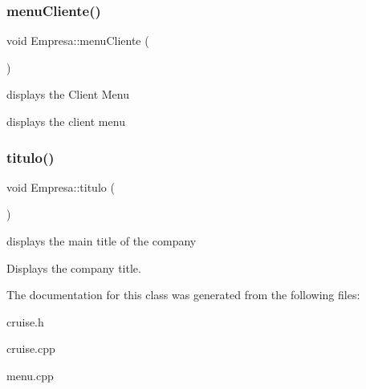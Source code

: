 \subsubsection{\texorpdfstring{menu\+Cliente()}{menuCliente()}}
{\footnotesize\ttfamily void Empresa\+::menu\+Cliente (\begin{DoxyParamCaption}{ }\end{DoxyParamCaption})}



displays the Client Menu 

displays the client menu \mbox{\label{classEmpresa_ad79f7196a8ce7256771cbd7b9542155c}} 
\subsubsection{\texorpdfstring{titulo()}{titulo()}}
{\footnotesize\ttfamily void Empresa\+::titulo (\begin{DoxyParamCaption}{ }\end{DoxyParamCaption})}



displays the main title of the company 

Displays the company title. 

The documentation for this class was generated from the following files\+:\begin{DoxyCompactItemize}
\item 
cruise.\+h\item 
cruise.\+cpp\item 
menu.\+cpp\end{DoxyCompactItemize}
